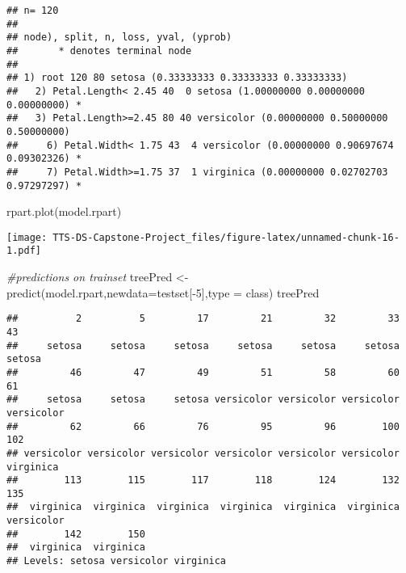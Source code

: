 \documentclass[
]{article}
\newenvironment{Shaded}{\begin{snugshade}}{\end{snugshade}}
\newcommand{\AttributeTok}[1]{\textcolor[rgb]{0.77,0.63,0.00}{#1}}
\newcommand{\CommentTok}[1]{\textcolor[rgb]{0.56,0.35,0.01}{\textit{#1}}}
\newcommand{\DecValTok}[1]{\textcolor[rgb]{0.00,0.00,0.81}{#1}}
\newcommand{\FunctionTok}[1]{\textcolor[rgb]{0.00,0.00,0.00}{#1}}
\newcommand{\NormalTok}[1]{#1}
\newcommand{\OtherTok}[1]{\textcolor[rgb]{0.56,0.35,0.01}{#1}}
\newcommand{\SpecialCharTok}[1]{\textcolor[rgb]{0.00,0.00,0.00}{#1}}
\newcommand{\StringTok}[1]{\textcolor[rgb]{0.31,0.60,0.02}{#1}}
\begin{document}
\begin{verbatim}
## n= 120 
## 
## node), split, n, loss, yval, (yprob)
##       * denotes terminal node
## 
## 1) root 120 80 setosa (0.33333333 0.33333333 0.33333333)  
##   2) Petal.Length< 2.45 40  0 setosa (1.00000000 0.00000000 0.00000000) *
##   3) Petal.Length>=2.45 80 40 versicolor (0.00000000 0.50000000 0.50000000)  
##     6) Petal.Width< 1.75 43  4 versicolor (0.00000000 0.90697674 0.09302326) *
##     7) Petal.Width>=1.75 37  1 virginica (0.00000000 0.02702703 0.97297297) *
\end{verbatim}

\begin{Shaded}
\begin{Highlighting}[]
\FunctionTok{rpart.plot}\NormalTok{(model.rpart)}
\end{Highlighting}
\end{Shaded}

\texttt{[image: TTS-DS-Capstone-Project\_files/figure-latex/unnamed-chunk-16-1.pdf]}

\begin{Shaded}
\begin{Highlighting}[]
\CommentTok{\#predictions on \textquotesingle{}trainset\textquotesingle{}}
\NormalTok{treePred }\OtherTok{\textless{}{-}} \FunctionTok{predict}\NormalTok{(model.rpart,}\AttributeTok{newdata=}\NormalTok{testset[}\SpecialCharTok{{-}}\DecValTok{5}\NormalTok{],}\AttributeTok{type =} \StringTok{\textquotesingle{}class\textquotesingle{}}\NormalTok{)}
\NormalTok{treePred}
\end{Highlighting}
\end{Shaded}

\begin{verbatim}
##          2          5         17         21         32         33         43 
##     setosa     setosa     setosa     setosa     setosa     setosa     setosa 
##         46         47         49         51         58         60         61 
##     setosa     setosa     setosa versicolor versicolor versicolor versicolor 
##         62         66         76         95         96        100        102 
## versicolor versicolor versicolor versicolor versicolor versicolor  virginica 
##        113        115        117        118        124        132        135 
##  virginica  virginica  virginica  virginica  virginica  virginica versicolor 
##        142        150 
##  virginica  virginica 
## Levels: setosa versicolor virginica
\end{verbatim}
\end{document}
